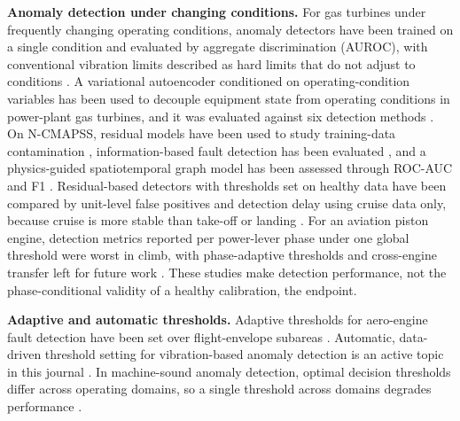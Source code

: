 \documentclass[preprint,11pt,a4paper]{elsarticle}
\begin{document}
\textbf{Anomaly detection under changing conditions.} For gas turbines under frequently changing operating conditions, anomaly detectors have been trained on a single condition and evaluated by aggregate discrimination (AUROC), with conventional vibration limits described as hard limits that do not adjust to conditions \cite{N13}. A variational autoencoder conditioned on operating-condition variables has been used to decouple equipment state from operating conditions in power-plant gas turbines, and it was evaluated against six detection methods \cite{N38}. On N-CMAPSS, residual models have been used to study training-data contamination \cite{ref7}, information-based fault detection has been evaluated \cite{ref8}, and a physics-guided spatiotemporal graph model has been assessed through ROC-AUC and F1 \cite{ref9}. Residual-based detectors with thresholds set on healthy data have been compared by unit-level false positives and detection delay using cruise data only, because cruise is more stable than take-off or landing \cite{N42}. For an aviation piston engine, detection metrics reported per power-lever phase under one global threshold were worst in climb, with phase-adaptive thresholds and cross-engine transfer left for future work \cite{N43}. These studies make detection performance, not the phase-conditional validity of a healthy calibration, the endpoint.

\textbf{Adaptive and automatic thresholds.} Adaptive thresholds for aero-engine fault detection have been set over flight-envelope subareas \cite{ref6}. Automatic, data-driven threshold setting for vibration-based anomaly detection is an active topic in this journal \cite{N14}. In machine-sound anomaly detection, optimal decision thresholds differ across operating domains, so a single threshold across domains degrades performance \cite{N37}.
\end{document}
